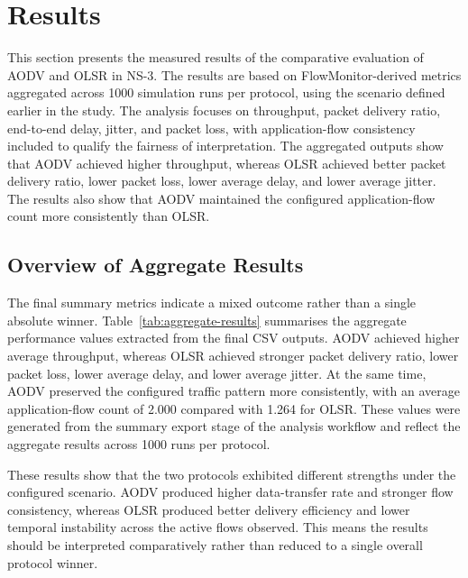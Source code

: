 \documentclass{Academic}
\begin{document}
\section{Results}

This section presents the measured results of the comparative evaluation of AODV and OLSR in NS-3. The results are based on FlowMonitor-derived metrics aggregated across 1000 simulation runs per protocol, using the scenario defined earlier in the study. The analysis focuses on throughput, packet delivery ratio, end-to-end delay, jitter, and packet loss, with application-flow consistency included to qualify the fairness of interpretation. The aggregated outputs show that AODV achieved higher throughput, whereas OLSR achieved better packet delivery ratio, lower packet loss, lower average delay, and lower average jitter. The results also show that AODV maintained the configured application-flow count more consistently than OLSR.

\subsection{Overview of Aggregate Results}

The final summary metrics indicate a mixed outcome rather than a single absolute winner. Table~\ref{tab:aggregate-results} summarises the aggregate performance values extracted from the final CSV outputs. AODV achieved higher average throughput, whereas OLSR achieved stronger packet delivery ratio, lower packet loss, lower average delay, and lower average jitter. At the same time, AODV preserved the configured traffic pattern more consistently, with an average application-flow count of 2.000 compared with 1.264 for OLSR. These values were generated from the summary export stage of the analysis workflow and reflect the aggregate results across 1000 runs per protocol.

These results show that the two protocols exhibited different strengths under the configured scenario. AODV produced higher data-transfer rate and stronger flow consistency, whereas OLSR produced better delivery efficiency and lower temporal instability across the active flows observed. This means the results should be interpreted comparatively rather than reduced to a single overall protocol winner.
\end{document}
